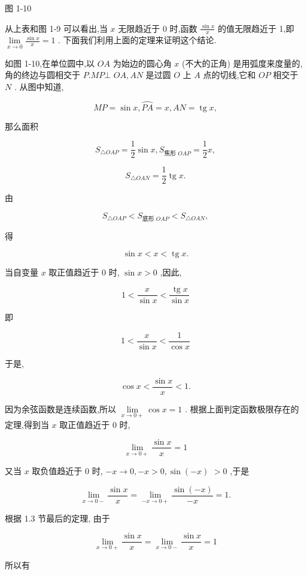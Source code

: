 \documentclass[lang=cn,newtx,10pt,scheme=chinese]{elegantbook}
\begin{document}
图 1-10

从上表和图 1-9 可以看出,当 \(x\) 无限趋近于 0 时,函数 \(\frac{\sin x}{x}\) 的值无限趋近于 1,即 \(\mathop{\lim }\limits_{{x \rightarrow 0}}\frac{\sin x}{x} = 1\) . 下面我们利用上面的定理来证明这个结论.

如图 1-10,在单位圆中,以 \({OA}\) 为始边的圆心角 \(x\) (不大的正角) 是用弧度来度量的,角的终边与圆相交于 \(P.{MP} \bot\) \({OA},{AN}\) 是过圆 \(O\) 上 \(A\) 点的切线,它和 \({OP}\) 相交于 \(N\) . 从图中知道,

\[
{MP} = \sin x,\overset{⏜}{PA} = x,{AN} = \operatorname{tg}x,
\]

那么面积

\[
{S}_{\bigtriangleup {OAP}} = \frac{1}{2}\sin x,{S}_{\text{焦形 }{OAP}} = \frac{1}{2}x,
\]

\[
{S}_{\bigtriangleup {OAN}} = \frac{1}{2}\operatorname{tg}x.
\]

由

\[
{S}_{\bigtriangleup {OAP}} < {S}_{\text{底形 }{OAP}} < {S}_{\bigtriangleup {OAN}},
\]

得

\[
\sin x < x < \operatorname{tg}x\text{.}
\]

当自变量 \(x\) 取正值趋近于 0 时, \(\sin x > 0\) ,因此,

\[
1 < \frac{x}{\sin x} < \frac{\operatorname{tg}x}{\sin x}
\]

即

\[
1 < \frac{x}{\sin x} < \frac{1}{\cos x}
\]

于是,

\[
\cos x < \frac{\sin x}{x} < 1\text{.}
\]

因为余弦函数是连续函数,所以 \(\mathop{\lim }\limits_{{x \rightarrow 0 + }}\cos x = 1\) . 根据上面判定函数极限存在的定理,得到当 \(x\) 取正值趋近于 0 时,

\[
\mathop{\lim }\limits_{{x \rightarrow 0 + }}\frac{\sin x}{x} = 1
\]

又当 \(x\) 取负值趋近于 0 时, \(- x \rightarrow 0, - x > 0,\sin \left( {-x}\right)\) \(> 0\) ,于是

\[
\mathop{\lim }\limits_{{x \rightarrow 0 - }}\frac{\sin x}{x} = \mathop{\lim }\limits_{{-x \rightarrow 0 + }}\frac{\sin \left( {-x}\right) }{-x} = 1.
\]

根据 1.3 节最后的定理, 由于

\[
\mathop{\lim }\limits_{{x \rightarrow 0 + }}\frac{\sin x}{x} = \mathop{\lim }\limits_{{x \rightarrow 0 - }}\frac{\sin x}{x} = 1
\]

所以有
\end{document}
